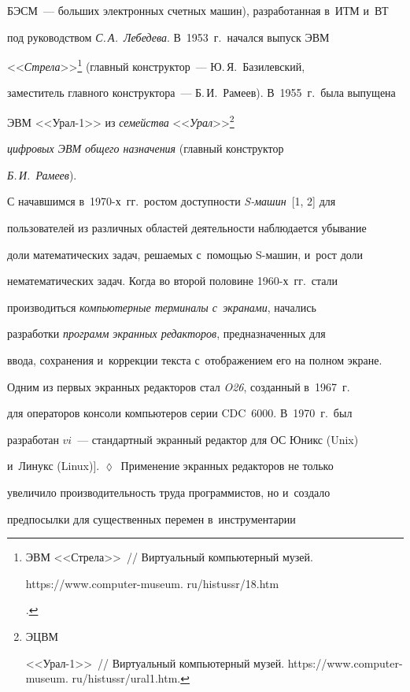 БЭСМ~--- больших электронных счет\-ных машин), разработанная в~ИТМ и~ВТ 


под руководством \textit{С.\,А.~Лебедева}. В~1953~г.\ начался вы\-пуск ЭВМ 


<<\textit{Стрела}>>\footnote{ЭВМ <<Стрела>>~/\!\!/ Виртуальный компьютерный музей. {\sf 


https://www.computer-museum. ru/histussr/18.htm}.} (глав\-ный конструктор~--- Ю.\,Я.~Базилевский, 


заместитель главного конструктора~--- Б.\,И.~Рамеев). В~1955~г.\ была выпущена 


ЭВМ <<Урал-1>> из \textit{семейства} <<\textit{Урал}>>\footnote{ЭЦВМ  


<<Урал-1>>~/\!\!/ Виртуальный компьютерный музей.  {\sf https://www.computer-museum. ru/histussr/ural1.htm}.} 


\textit{циф\-ро\-вых ЭВМ общего на\-зна\-че\-ния} (глав\-ный конструктор 


\textit{Б.\,И.~Рамеев}). 


  


  С начавшимся в~1970-х~гг.\ рос\-том до\-ступ\-ности \textit{S-ма\-шин}~[1, 2] для 


пользователей из различных областей де\-я\-тель\-ности наблюдается убывание 


доли математических задач, ре\-ша\-емых с~по\-мощью S-ма\-шин, и~рост доли 


нематематических задач. Когда во второй половине 1960-х~гг.\ стали 


производиться \textit{компьютерные терминалы с~экранами}, начались 


раз\-ра\-бот\-ки \textit{программ экранных редакторов}, пред\-на\-зна\-чен\-ных для 


ввода, сохранения и~коррекции текс\-та с~отображением его на пол\-ном экране. 


Одним из пер\-вых экранных редакторов стал \textit{O26}, созданный в~1967~г.\ 


для операторов консоли компьютеров серии CDC~6000. В~1970~г.\ был 


разработан $vi$~--- стандартный экранный редактор для ОС Юникс (Unix) 


и~Линукс (Linux)]. $\lozenge$~Применение экранных редакторов не только 


увеличило про\-из\-во\-ди\-тель\-ность труда программистов, но и~создало 


предпосылки для существенных перемен в~инструментарии 


